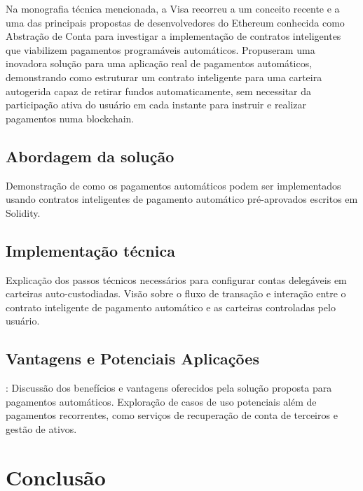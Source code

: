 \documentclass[12pt]{article}
\begin{document}
Na monografia técnica mencionada, a Visa recorreu a um conceito recente e a uma das principais
propostas de desenvolvedores do Ethereum conhecida como Abstração de Conta para investigar a
implementação de contratos inteligentes que viabilizem pagamentos programáveis automáticos.
Propuseram uma inovadora solução para uma aplicação real de pagamentos automáticos, demonstrando
como estruturar um contrato inteligente para uma carteira autogerida capaz de retirar fundos
automaticamente, sem necessitar da participação ativa do usuário em cada instante para instruir e
realizar pagamentos numa blockchain.

\subsection{Abordagem da solução}

Demonstração de como os pagamentos automáticos podem ser implementados usando contratos
inteligentes de pagamento automático pré-aprovados escritos em Solidity.

\subsection{Implementação técnica}

Explicação dos passos técnicos necessários para configurar contas delegáveis em carteiras
auto-custodiadas. Visão sobre o fluxo de transação e interação entre o contrato inteligente de
pagamento automático e as carteiras controladas pelo usuário.

\subsection{Vantagens e Potenciais Aplicações}:
Discussão dos benefícios e vantagens oferecidos pela solução proposta para pagamentos automáticos.
Exploração de casos de uso potenciais além de pagamentos recorrentes, como serviços de recuperação de conta de terceiros e gestão de ativos.

\section{Conclusão}\label{sec:conclusao}



\end{document}
